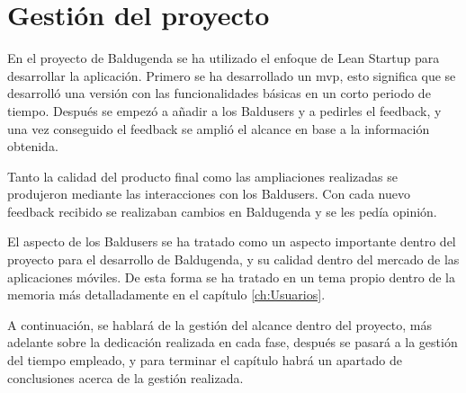 \chapter{Gestión del proyecto}
\label{ch:Gestion del proyecto}
En el proyecto de Baldugenda se ha utilizado el enfoque de Lean Startup \cite{LeanStartup} para desarrollar la aplicación. Primero se ha desarrollado un \acrshort{mvp}, esto significa que se desarrolló una versión con las funcionalidades básicas en un corto periodo de tiempo. Después se empezó a añadir a los Baldusers y a pedirles el feedback, y una vez conseguido el feedback se amplió el alcance en base a la información obtenida.

Tanto la calidad del producto final como las ampliaciones realizadas se produjeron mediante las interacciones con los Baldusers. Con cada nuevo feedback recibido se realizaban cambios en Baldugenda y se les pedía opinión.

El aspecto de los Baldusers se ha tratado como un aspecto importante dentro del proyecto para el desarrollo de Baldugenda, y su calidad dentro del mercado de las aplicaciones móviles. De esta forma se ha tratado en un tema propio dentro de la memoria más detalladamente en el capítulo \ref{ch:Usuarios}.

A continuación, se hablará de la gestión del alcance dentro del proyecto, más adelante sobre la dedicación realizada en cada fase, después se pasará a la gestión del tiempo empleado, y para terminar el capítulo habrá un apartado de conclusiones acerca de la gestión realizada.
\newpage

\newpage

\newpage

\newpage
































